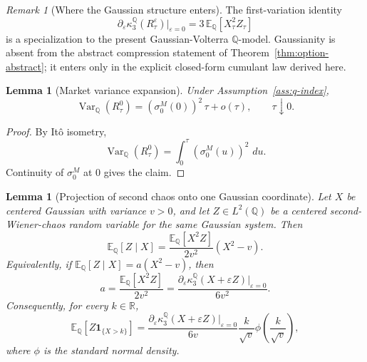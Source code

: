\documentclass[11pt,a4paper]{amsart}
\theoremstyle{plain}
\newtheorem{lemma}[theorem]{Lemma}
\theoremstyle{definition}
\theoremstyle{remark}
\newtheorem{remark}[theorem]{Remark}
\DeclareMathOperator{\Var}{Var}
\newcommand{\R}{\mathbb{R}}
\newcommand{\QQ}{\mathbb{Q}}
\newcommand{\EE}{\mathbb{E}}
\newcommand{\one}{\mathbf{1}}
\newcommand{\dd}{\,d}
\begin{document}
\begin{remark}[Where the Gaussian structure enters]
The first-variation identity
\[
        \partial_\varepsilon
        \kappa_3^\QQ(R_\tau^\varepsilon)\big|_{\varepsilon=0}
        =
        3\,\EE_\QQ[X_\tau^2 Z_\tau]
\]
is a specialization to the present Gaussian-Volterra \(\QQ\)-model.  Gaussianity is absent from
the abstract compression statement of Theorem~\ref{thm:option-abstract}; it enters only in the
explicit closed-form cumulant law derived here.
\end{remark}

\begin{lemma}[Market variance expansion]\label{lem:market-var}
Under Assumption~\ref{ass:q-index},
\[
        \Var_\QQ(R_\tau^0)
        =
        (\sigma_0^M(0))^2\,\tau + o(\tau),
        \qquad
        \tau\downarrow0.
\]
\end{lemma}

\begin{proof}
By It\^o isometry,
\[
        \Var_\QQ(R_\tau^0)=\int_0^\tau (\sigma_0^M(u))^2\,\dd u.
\]
Continuity of \(\sigma_0^M\) at \(0\) gives the claim.
\end{proof}

\begin{lemma}[Projection of second chaos onto one Gaussian coordinate]\label{lem:second-chaos-projection}
Let \(X\) be centered Gaussian with variance \(v>0\), and let \(Z\in L^2(\QQ)\) be a centered
second-Wiener-chaos random variable for the same Gaussian system.  Then
\[
        \EE_\QQ[Z\mid X]
        =
        \frac{\EE_\QQ[X^2Z]}{2v^2}(X^2-v).
\]
Equivalently, if \(\EE_\QQ[Z\mid X]=a(X^2-v)\), then
\[
        a=\frac{\EE_\QQ[X^2Z]}{2v^2}
        =
        \frac{\partial_\varepsilon\kappa_3^\QQ(X+\varepsilon Z)|_{\varepsilon=0}}{6v^2}.
\]
Consequently, for every \(k\in\R\),
\[
        \EE_\QQ[Z\one_{\{X>k\}}]
        =
        \frac{\partial_\varepsilon\kappa_3^\QQ(X+\varepsilon Z)|_{\varepsilon=0}}{6v}
        \frac{k}{\sqrt v}\phi\!\left(\frac{k}{\sqrt v}\right),
\]
where \(\phi\) is the standard normal density.
\end{lemma}
\end{document}
